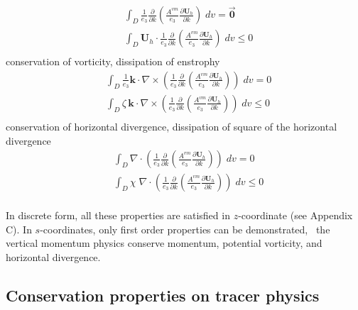 \documentclass[../main/NEMO_manual]{subfiles}
\begin{document}
\[
  \begin{aligned}
    & \int_D {\frac{1}{e_3 }}  \frac{\partial }{\partial k}\left( \frac{A^{vm}}{e_3 }\frac{\partial {\textbf{U}}_h }{\partial k} \right) \;dv = \overrightarrow{\textbf{0}} \\
    & \int_D \textbf{U}_h \cdot \frac{1}{e_3} \frac{\partial}{\partial k} \left( {\frac{A^{vm}}{e_3 }}{\frac{\partial \textbf{U}_h }{\partial k}} \right) \;dv \leq 0 \\
  \end{aligned}
\]
conservation of vorticity, dissipation of enstrophy
\[
  \begin{aligned}
    & \int_D {\frac{1}{e_3 }{\mathrm {\mathbf k}}\cdot \nabla \times \left( {\frac{1}{e_3
          }\frac{\partial }{\partial k}\left( {\frac{A^{vm}}{e_3 }\frac{\partial {\mathrm
                  {\mathbf U}}_h }{\partial k}} \right)} \right)\;dv} =0 \\
    & \int_D {\zeta \,{\mathrm {\mathbf k}}\cdot \nabla \times \left( {\frac{1}{e_3
          }\frac{\partial }{\partial k}\left( {\frac{A^{vm}}{e_3 }\frac{\partial {\mathrm
                  {\mathbf U}}_h }{\partial k}} \right)} \right)\;dv} \leq 0 \\
  \end{aligned}
\]
conservation of horizontal divergence, dissipation of square of the horizontal divergence
\[
  \begin{aligned}
    &\int_D {\nabla \cdot \left( {\frac{1}{e_3 }\frac{\partial }{\partial
            k}\left( {\frac{A^{vm}}{e_3 }\frac{\partial {\mathrm {\mathbf U}}_h }{\partial k}}
          \right)} \right)\;dv} =0 \\
    & \int_D {\chi \;\nabla \cdot \left( {\frac{1}{e_3 }\frac{\partial }{\partial
            k}\left( {\frac{A^{vm}}{e_3 }\frac{\partial {\mathrm {\mathbf U}}_h }{\partial k}}
          \right)} \right)\;dv} \leq 0 \\
  \end{aligned}
\]

In discrete form, all these properties are satisfied in $z$-coordinate (see Appendix C).
In $s$-coordinates, only first order properties can be demonstrated,
\ie\ the vertical momentum physics conserve momentum, potential vorticity, and horizontal divergence.

\subsection{Conservation properties on tracer physics}
\label{subsec:CONS_Invariant_tra_physics}
\end{document}
